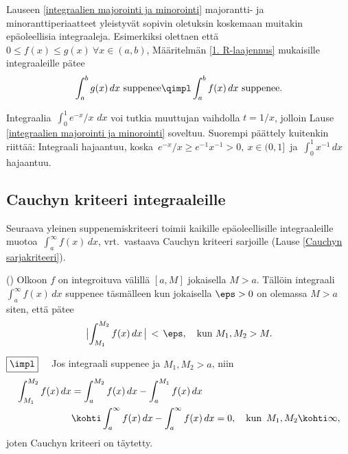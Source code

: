 Lauseen \ref{integraalien majorointi ja minorointi} majorantti- ja minoranttiperiaatteet
yleistyvät sopivin oletuksin koskemaan muitakin epäoleellisia integraaleja. Esimerkiksi
olettaen että $0 \le f(x) \le g(x)\ \forall x\in(a,b)$, Määritelmän \ref{1. R-laajennus}
mukaisille integraaleille pätee
\[
\int_a^b g(x)\,dx\ \text{suppenee} \qimpl \int_a^b f(x)\,dx\ \text{suppenee}.
\]
\begin{Exa} Integraalia $\,\int_0^1 e^{-x}/x\,\,dx$ voi tutkia muuttujan vaihdolla $t=1/x$,
jolloin Lause \ref{integraalien majorointi ja minorointi} soveltuu. Suorempi päättely kuitenkin
riittää: Integraali hajaantuu, koska $\,e^{-x}/x \ge e^{-1}x^{-1} > 0,\ x\in(0,1]\,$ ja
$\,\int_0^1 x^{-1}\,dx$ hajaantuu. \loppu
\end{Exa}

\subsection{Cauchyn kriteeri integraaleille}

Seuraava yleinen suppenemiskriteeri toimii kaikille epäoleellisille integraaleille muotoa
$\,\int_a^\infty f(x)\,dx$, vrt.\ vastaava Cauchyn kriteeri sarjoille
(Lause \ref{Cauchyn sarjakriteeri}).
\begin{Lause} \label{Cauchyn integraalikriteeri} ()
Olkoon $f$ on integroituva välillä $[a,M]$ jokaisella $M>a$. Tällöin integraali
$\int_a^\infty f(x)\, dx$ suppenee täsmälleen kun jokaisella $\eps>0$ on olemassa $M>a$ siten,
että pätee
\[
\bigl|\int_{M_1}^{M_2} f(x)\,dx\,\bigr| \,<\, \eps, \quad \text{kun}\ M_1,M_2>M.
\]
\end{Lause}
\tod $\boxed{\impl}\quad$ Jos integraali suppenee ja $M_1,M_2>a$, niin
\begin{align*}
\int_{M_1}^{M_2} f(x)\, dx &= \int_a^{M_2} f(x)\, dx-\int_a^{M_1} f(x)\, dx \\
                            &\kohti \int_a^\infty f(x)\, dx-\int_a^\infty f(x)\, dx=0, \quad 
                                                      \text{kun}\,\ M_1,M_2\kohti\infty,
\end{align*}
joten Cauchyn kriteeri on täytetty.

